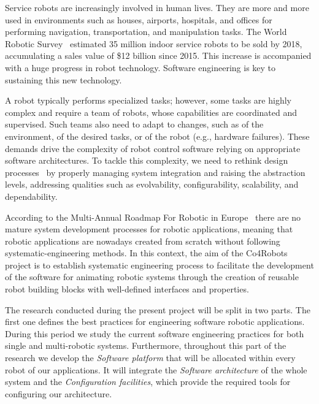 Service robots are increasingly involved in human lives. 
They are more and more used in environments such as houses, airports, hospitals, and offices for performing navigation, transportation, and manipulation tasks. 
The World Robotic Survey~\cite{wrs:online} estimated 35 million indoor service robots to be sold by 2018, accumulating a sales value of \$12 billion since 2015. 
This increase is accompanied with a huge progress in robot technology. %
Software engineering is key to sustaining this new technology.

A robot typically performs specialized tasks; however, some tasks are highly complex and require a team of robots, whose capabilities %
are coordinated and supervised. 
Such teams also need to adapt to changes, such as of the environment, of the desired tasks, or of the robot (e.g., hardware failures). 
These demands drive the complexity of robot control software relying on appropriate software architectures. 
To tackle this complexity, we need to rethink design processes~\cite{Lee2008} by properly managing system integration and raising the abstraction levels, addressing qualities such as evolvability, configurability, scalability, and dependability.

According to the Multi-Annual Roadmap For Robotic in Europe~\cite{roadmap} there are no mature system development processes for robotic applications, meaning that robotic applications are nowadays created from scratch without following systematic-engineering methods.
In this context, the aim of the Co4Robots project is to establish systematic engineering process to facilitate the development of the software for animating robotic systems through the creation of reusable robot building blocks with well-defined interfaces and properties. 

The research conducted during the present project will be split in two parts.
The first one defines the best practices for engineering software robotic applications.
During this period we study the current software engineering practices for both single and multi-robotic systems.
Furthermore, throughout this part of the research we develop the \emph{Software platform} that will be allocated within every robot of our applications.
It will integrate the \emph{Software architecture} of the whole system and  the \emph{Configuration facilities}, which provide the required tools for configuring our architecture.%

